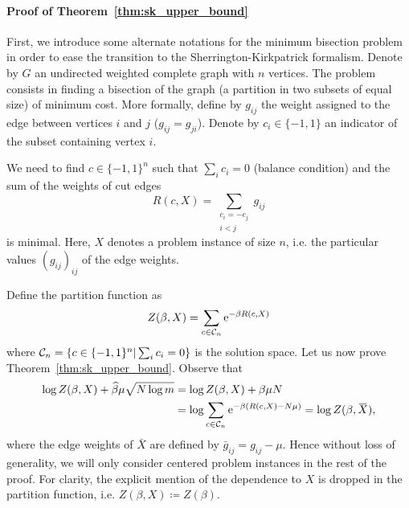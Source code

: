 \paragraph{Proof of Theorem~\ref{thm:sk_upper_bound}}
First, we introduce some alternate notations for the minimum bisection problem
in order to ease the transition to the Sherrington-Kirkpatrick formalism.
Denote by $G$ an undirected weighted complete graph with $n$ vertices. The
problem consists in finding a bisection of the graph (a partition in two subsets
of equal size) of minimum cost.
More formally, define by $g_{ij}$ the weight assigned to the edge between
vertices $i$ and $j$ ($g_{ij}=g_{ji}$). Denote by $c_i \in \{-1, 1\}$ an
indicator of the subset containing vertex $i$.

We need to find $c \in \{-1,1\}^n$ such that $\sum_i c_i=0$
(balance condition) and the sum of the weights of cut edges
\begin{equation}
  R(c,X) = \sum_{\substack{c_i=-c_j\\i<j}} g_{ij}
\end{equation}
is minimal. Here, $X$ denotes a problem instance of size $n$, i.e. the
particular values $(g_{ij})_{ij}$ of the edge weights.

Define the partition function as
\begin{equation}
  Z(\beta,X) = \sum_{c\in{\cal C}_n} \mathrm{e}^{-\beta R(c,X)}
\end{equation}
where ${\cal C}_n = \{c\in\{-1,1\}^n | \sum_i c_i = 0\}$ is the solution space. Let us
now prove Theorem~\ref{thm:sk_upper_bound}. Observe that
\begin{align}
  \log Z(\beta,X) + \widehat{\beta}\mu\sqrt{N\log m} &= \log Z(\beta,X)+ \beta\mu N \notag \\
    &= \log \sum_{c\in{\cal C}_n} \mathrm{e}^{-\beta(R(c,X)-N\mu)} = \log Z(\beta,\mspace{2mu}\overline{\mspace{-2mu}X\mspace{-2mu}}\mspace{2mu}),
\end{align}
where the edge weights of $\bar{X}$ are defined by $\bar{g}_{ij}=g_{ij} - \mu$.
Hence without loss of generality, we will only consider centered problem
instances in the rest of the proof. For clarity, the explicit mention of the
dependence to $X$ is dropped in the partition function, i.e. $Z(\beta, X) \coloneqq
Z(\beta)$.

